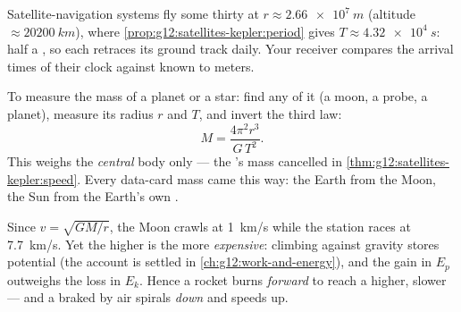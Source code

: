 \begin{example}\label{ex:g12:satellites-kepler:gps}
Satellite-navigation systems fly some thirty  at
$r \approx \qty{2.66e7}{m}$ (altitude $\approx \qty{20200}{km}$),
where \cref{prop:g12:satellites-kepler:period} gives $T \approx
\qty{4.32e4}{s}$: half a , so each  retraces
its ground track daily. Your receiver compares the arrival times of
their clock  against  known to meters.
\end{example}

\begin{method}\label{met:g12:satellites-kepler:weigh}
%
To measure the mass of a planet or a star: find any  of it
(a moon, a probe, a planet), measure its  radius $r$ and 
$T$, and invert the third law:
\[ M = \frac{4\pi^2 r^3}{G\,T^2}. \]
This weighs the \emph{central} body only --- the 's mass
cancelled in \cref{thm:g12:satellites-kepler:speed}. Every data-card
mass came this way: the Earth from the Moon, the Sun from the
Earth's own .
\end{method}

\begin{remark}\label{rem:g12:satellites-kepler:energy}
Since $v = \sqrt{GM/r}$, the Moon crawls at \qty{1}{km/s} while the
station races at \qty{7.7}{km/s}. Yet the higher  is the more
\emph{expensive}: climbing against gravity stores potential 
(the account is settled in \cref{ch:g12:work-and-energy}), and the
gain in $E_p$ outweighs the loss in $E_k$. Hence a rocket burns
\emph{forward} to reach a higher, slower  --- and a 
braked by  air spirals \emph{down} and speeds up.
\end{remark}

